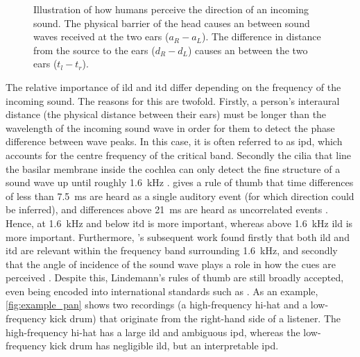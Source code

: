 \begin{figure}[htb]
{
    }
    \caption{Illustration of how humans perceive the direction of an incoming sound. The physical barrier of the head causes an  between sound waves received at the two ears ($a_R-a_L$). The difference in distance from the source to the ears ($d_R - d_L$) causes an  between the two ears ($t_l-t_r$).}
    \label{fig:directional_hearing}
\end{figure}


The relative importance of \gls{ild} and \gls{itd} differ depending on the frequency of the incoming sound. The reasons for this are twofold. Firstly, a person's interaural distance (the physical distance between their ears) must be longer than the wavelength of the incoming sound wave in order for them to detect the phase difference between wave peaks. In this case, it is often referred to as \gls{ipd}, which accounts for the centre frequency of the critical band. Secondly the cilia that line the basilar membrane inside the cochlea can only detect the fine structure of a sound wave up until roughly \qty{1.6}{\kHz} \cite{lindemannEvaluationInterauralSignal1982}. \citeauthor{lindemannEvaluationInterauralSignal1982} gives a rule of thumb that time differences of less than \qty{7.5}{\ms} are heard as a single auditory event (for which direction could be inferred), and differences above \qty{21}{\ms} are heard as uncorrelated events \cite{lindemannEvaluationInterauralSignal1982}. Hence, at \qty{1.6}{\kHz} and below \gls{itd} is more important, whereas above \qty{1.6}{\kHz} \gls{ild} is more important. Furthermore, \citeauthor{blauertSpatialHearingOne1996}'s subsequent work found firstly that both \gls{ild} and \gls{itd} are relevant within the frequency band surrounding \qty{1.6}{\kHz}, and secondly that the angle of incidence of the sound wave plays a role in how the cues are perceived \cite{blauertSpatialHearingOne1996}. Despite this, Lindemann's rules of thumb are still broadly accepted, even being encoded into international standards such as  \cite{iso-11172-3:mpeg_audio}. As an example, \cref{fig:example_pan} shows two recordings (a high-frequency hi-hat and a low-frequency kick drum) that originate from the right-hand side of a listener. The high-frequency hi-hat has a large \gls{ild} and ambiguous \gls{ipd}, whereas the low-frequency kick drum has negligible \gls{ild}, but an interpretable \gls{ipd}.


